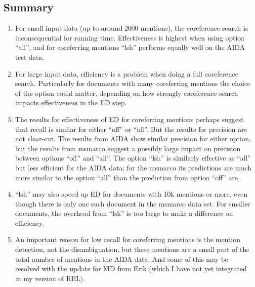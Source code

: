 \documentclass[a4paper,11pt]{article}
\numberwithin{equation}{section} %
\begin{document}
\subsection{Summary}
\begin{enumerate}
 \item For small input data (up to around 2000 mentions), the coreference search is inconsequential for running time. Effectiveness is highest when using option ``all'', and for coreferring mentions ``lsh'' performs equally well on the AIDA test data.
 \item For large input data, efficiency is a problem when doing a full coreference search. Particularly for documents with many coreferring mentions the choice of the option could matter, depending on how strongly coreference search impacts effectiveness in the ED step. 
 \item The results for effectiveness of ED for coreferring mentions perhaps suggest that recall is similar for either ``off'' or ``all''. But the results for precision are not clear-cut. The results from AIDA show similar precision for either option, but the results from msmarco suggest a possibly large impact on precision between options ``off'' and ``all''. 
 The option ``lsh'' is similarly effective as ``all'' but less efficient for the AIDA data; for the msmarco its predictions are much more similar to the option ``all'' than the prediction from option ``off'' are. 
 \item ``lsh'' may also speed up ED for documents with 10k mentions or more, even though there is only one such document in the msmarco data set. For smaller documents, the overhead from ``lsh'' is too large to make a difference on efficiency.  
 \item An important reason for low recall for coreferring mentions is the mention detection, not the disambiguation, but these mentions are a small part of the total number of mentions in the AIDA data. And some of this may be resolved with the update for MD from Erik (which I have not yet integrated in my version of REL).
\end{enumerate}
\end{document}
